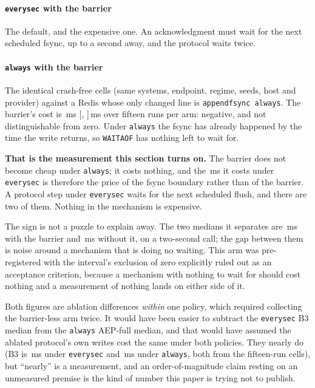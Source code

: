 \documentclass[10pt,journal,compsoc]{IEEEtran}
\begin{document}
\paragraph{\texttt{everysec} with the barrier} The default, and the expensive
one. An acknowledgment must wait for the next scheduled fsync, up to a second
away, and the protocol waits twice.

\paragraph{\texttt{always} with the barrier} The identical crash-free cells
(same systems, endpoint, regime, seeds, host and provider) against a Redis
whose only changed line is \texttt{appendfsync always}.
The barrier's cost is \BarrierCostAlwaysFortyFive{}\,ms
[\BarrierCostAlwaysFortyFiveLow{}, \BarrierCostAlwaysFortyFiveHigh{}]\,ms over
fifteen runs per arm: negative, and not distinguishable from zero. Under
\texttt{always} the fsync has already happened by the time the write returns,
so \texttt{WAITAOF} has nothing left to wait for.

\textbf{That is the measurement this section turns on.} The barrier does not
become cheap under \texttt{always}; it costs nothing, and the
\BarrierCostFifteen{}\,ms it costs under \texttt{everysec} is therefore the
price of the fsync boundary rather than of the barrier. A protocol step under
\texttt{everysec} waits for the next scheduled flush, and there are two of
them. Nothing in the mechanism is expensive.

The sign is not a puzzle to explain away. The two medians it separates are
\AepAlwaysFortyFiveMedian{}\,ms with the barrier and
\BthreeAlwaysFortyFiveMedian{}\,ms without it, on a two-second call; the gap
between them is noise around a mechanism that is doing no waiting. This arm was
pre-registered with the interval's exclusion of zero explicitly ruled out as an
acceptance criterion, because a mechanism with nothing to wait for should cost
nothing and a measurement of nothing lands on either side of it.

Both figures are ablation differences \emph{within} one policy, which required
collecting the barrier-less arm twice. It would have been easier to subtract
the \texttt{everysec} B3 median from the \texttt{always} AEP-full median, and
that would have assumed the ablated protocol's own writes cost the same under
both policies. They nearly do (B3 is \BthreeEverysecFifteenMedian{}\,ms under
\texttt{everysec} and \BthreeAlwaysFortyFiveMedian{}\,ms under
\texttt{always}, both from the fifteen-run cells), but
``nearly'' is a measurement, and an order-of-magnitude claim resting on an
unmeasured premise is the kind of number this paper is trying not to publish.
\end{document}
